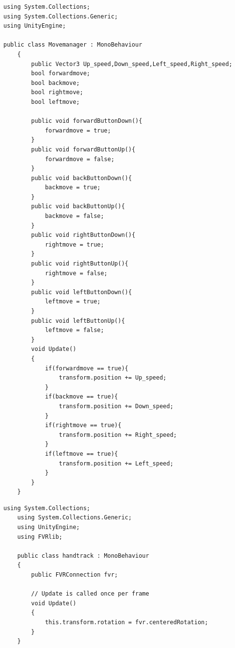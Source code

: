 \documentclass{ltjsreport}
\begin{document}
\clearpage

\begin{lstlisting}[caption=MoveManager.cs, label=code:Move]
	using System.Collections;
using System.Collections.Generic;
using UnityEngine;

public class Movemanager : MonoBehaviour
	{
		public Vector3 Up_speed,Down_speed,Left_speed,Right_speed;
		bool forwardmove;
		bool backmove;
		bool rightmove;
		bool leftmove;

		public void forwardButtonDown(){
			forwardmove = true;
		}
		public void forwardButtonUp(){
			forwardmove = false;
		}
		public void backButtonDown(){
			backmove = true;
		}
		public void backButtonUp(){
			backmove = false;
		}
		public void rightButtonDown(){
			rightmove = true;
		}
		public void rightButtonUp(){
			rightmove = false;
		}
		public void leftButtonDown(){
			leftmove = true;
		}
		public void leftButtonUp(){
			leftmove = false;
		}
		void Update()
		{
			if(forwardmove == true){
				transform.position += Up_speed;
			}
			if(backmove == true){
				transform.position += Down_speed;
			}
			if(rightmove == true){
				transform.position += Right_speed;
			}
			if(leftmove == true){
				transform.position += Left_speed;
			}
		}
	}
\end{lstlisting}

\begin{lstlisting}[caption=handtrack.cs, label=code:track]
	using System.Collections;
	using System.Collections.Generic;
	using UnityEngine;
	using FVRlib;

	public class handtrack : MonoBehaviour
	{
		public FVRConnection fvr;

		// Update is called once per frame
		void Update()
		{
			this.transform.rotation = fvr.centeredRotation;
		}
	}
\end{lstlisting}
\end{document}
